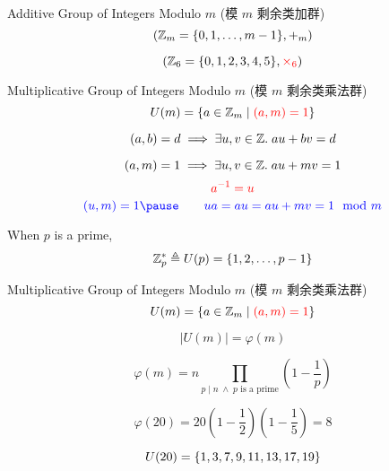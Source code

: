 \begin{frame}
  \begin{exampleblock}{Additive Group of Integers Modulo $m$ (模 $m$ 剩余类加群)}
    \[
      (\mathbb{Z}_{m} = \{0, 1, \dots, m-1\}, +_{m})
    \]
  \end{exampleblock}

  \pause
  \vspace{0.30cm}
  \[
    (\mathbb{Z}_{6} = \{0, 1, 2, 3, 4, 5\}, \textcolor{red}{\times_{6}})
  \]
\end{frame}

\begin{frame}
  \begin{exampleblock}{Multiplicative Group of Integers Modulo $m$ (模 $m$ 剩余类乘法群)}
    \[
      U(m) = \{a \in \mathbb{Z}_{m} \mid \textcolor{red}{(a, m) = 1}\}
    \]
  \end{exampleblock}

  \pause
  \vspace{0.60cm}
  \begin{theorem}
    \[
      (a, b) = d \implies \exists u, v \in \mathbb{Z}.\; au + bv = d
    \]
  \end{theorem}

  \pause
  \[
    (a, m) = 1 \implies \exists u, v \in \mathbb{Z}.\; au + mv = 1
  \]
  \pause
  \[
    \textcolor{red}{a^{-1} = u}
  \]
  \pause
  \[
    \blue{(u, m) = 1 \pause\qquad ua = au = au + mv = 1\mod{m}}
  \]
\end{frame}

\begin{frame}{}
  \begin{center}
    When $p$ is a prime,
    \[
      \mathbb{Z}^{\ast}_{p} \triangleq U(p) = \{1, 2, \dots, p-1\}
    \]
  \end{center}
\end{frame}

\begin{frame}
  \begin{exampleblock}{Multiplicative Group of Integers Modulo $m$ (模 $m$ 剩余类乘法群)}
    \[
      U(m) = \{a \in \mathbb{Z}_{m} \mid \textcolor{red}{(a, m) = 1}\}
    \]
  \end{exampleblock}

  \pause
  \[
    \big\lvert U(m) \big\rvert = \varphi(m)
  \]

  \pause
  \vspace{0.50cm}
  \begin{definition}
    \[
      \varphi(m) = n \prod_{p \mid n \;\land\; p \text{ is a prime}}
        \left(1 - \frac{1}{p} \right)
    \]
  \end{definition}

  \pause
  \[
    \varphi(20) = 20 (1 - \frac{1}{2}) (1 - \frac{1}{5}) = 8
  \]

  \pause
  \[
    U(20) = \{1, 3, 7, 9, 11, 13, 17, 19\}
  \]
\end{frame}

